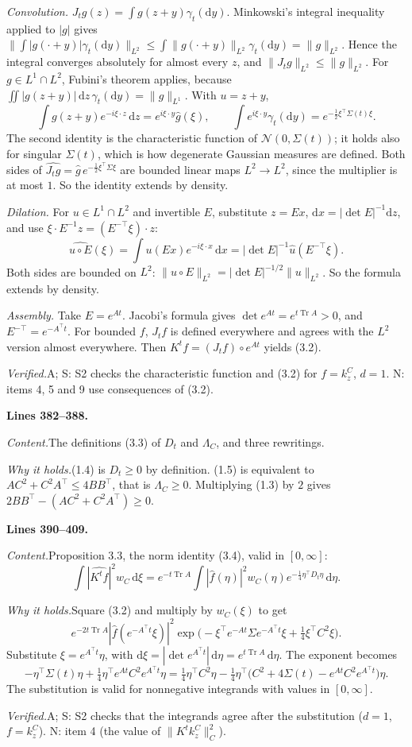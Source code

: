 \documentclass[11pt]{amsart}
\newcommand{\Tr}{\operatorname{Tr}}
\newcommand{\dd}{\,\mathrm{d}}
\newcommand{\hatf}[1]{\widehat{#1}}
\newcommand{\tp}{\top}
\newcommand{\src}[1]{\par\bigskip\noindent\textbf{Lines #1.}\enspace}
\newcommand{\content}{\par\smallskip\noindent\textit{Content.}\enspace}
\newcommand{\why}{\par\smallskip\noindent\textit{Why it holds.}\enspace}
\newcommand{\verified}{\par\smallskip\noindent\textit{Verified.}\enspace}
\newcommand{\tA}{\textsf{A}}
\newcommand{\tS}{\textsf{S}}
\newcommand{\tN}{\textsf{N}}
\begin{document}
\emph{Convolution.} $J_tg(z)=\int g(z+y)\gamma_t(\mathrm dy)$. Minkowski's integral inequality applied to $|g|$ gives
$\bigl\|\int|g(\cdot+y)|\gamma_t(\mathrm dy)\bigr\|_{L^2}\le\int\|g(\cdot+y)\|_{L^2}\gamma_t(\mathrm dy)=\|g\|_{L^2}$.
Hence the integral converges absolutely for almost every $z$, and $\|J_tg\|_{L^2}\le\|g\|_{L^2}$. For $g\in L^1\cap L^2$,
Fubini's theorem applies, because $\iint|g(z+y)|\dd z\,\gamma_t(\mathrm dy)=\|g\|_{L^1}$. With $u=z+y$,
\[
\int g(z+y)e^{-i\xi\cdot z}\dd z=e^{i\xi\cdot y}\hatf g(\xi),\qquad
\int e^{i\xi\cdot y}\gamma_t(\mathrm dy)=e^{-\frac12\xi^\tp\Sigma(t)\xi}.
\]
The second identity is the characteristic function of $\mathcal N(0,\Sigma(t))$; it holds also for singular
$\Sigma(t)$, which is how degenerate Gaussian measures are defined. Both sides of
$\hatf{J_tg}=\hatf g\,e^{-\frac12\xi^\tp\Sigma\xi}$ are bounded linear maps $L^2\to L^2$, since the multiplier is at
most $1$. So the identity extends by density.

\emph{Dilation.} For $u\in L^1\cap L^2$ and invertible $E$, substitute $z=Ex$, $\mathrm dx=|\det E|^{-1}\mathrm dz$,
and use $\xi\cdot E^{-1}z=(E^{-\tp}\xi)\cdot z$:
\[
\hatf{u\circ E}(\xi)=\int u(Ex)e^{-i\xi\cdot x}\dd x=|\det E|^{-1}\hatf u(E^{-\tp}\xi).
\]
Both sides are bounded on $L^2$: $\|u\circ E\|_{L^2}=|\det E|^{-1/2}\|u\|_{L^2}$. So the formula extends by density.

\emph{Assembly.} Take $E=e^{At}$. Jacobi's formula gives $\det e^{At}=e^{t\Tr A}>0$, and
$E^{-\tp}=e^{-A^\tp t}$. For bounded $f$, $J_tf$ is defined everywhere and agrees with the $L^2$ version almost
everywhere. Then $K^tf=(J_tf)\circ e^{At}$ yields (3.2).
\verified \tA; \tS: S2 checks the characteristic function and (3.2) for $f=k^C_z$, $d=1$. \tN: items 4, 5 and 9 use
consequences of (3.2).

\src{382--388}
\content The definitions (3.3) of $D_t$ and $\Lambda_C$, and three rewritings.
\why (1.4) is $D_t\ge0$ by definition. (1.5) is equivalent to $AC^2+C^2A^\tp\le4BB^\tp$, that is $\Lambda_C\ge0$.
Multiplying (1.3) by $2$ gives $2BB^\tp-(AC^2+C^2A^\tp)\ge0$.

\src{390--409}
\content Proposition 3.3, the norm identity (3.4), valid in $[0,\infty]$:
\[
\int|\hatf{K^tf}|^2w_C\dd\xi=e^{-t\Tr A}\int|\hatf f(\eta)|^2w_C(\eta)e^{-\frac14\eta^\tp D_t\eta}\dd\eta .
\]
\why Square (3.2) and multiply by $w_C(\xi)$ to get
\[
e^{-2t\Tr A}|\hatf f(e^{-A^\tp t}\xi)|^2\exp\bigl(-\xi^\tp e^{-At}\Sigma e^{-A^\tp t}\xi+\tfrac14\xi^\tp C^2\xi\bigr).
\]
Substitute
$\xi=e^{A^\tp t}\eta$, with $\mathrm d\xi=|\det e^{A^\tp t}|\dd\eta=e^{t\Tr A}\dd\eta$. The exponent becomes
\[
-\eta^\tp\Sigma(t)\eta+\tfrac14\eta^\tp e^{At}C^2e^{A^\tp t}\eta
=\tfrac14\eta^\tp C^2\eta-\tfrac14\eta^\tp\bigl(C^2+4\Sigma(t)-e^{At}C^2e^{A^\tp t}\bigr)\eta .
\]
The substitution is valid for nonnegative integrands with values in $[0,\infty]$.
\verified \tA; \tS: S2 checks that the integrands agree after the substitution ($d=1$, $f=k^C_z$). \tN: item 4 (the
value of $\|K^tk^C_z\|_C^2$).
\end{document}
